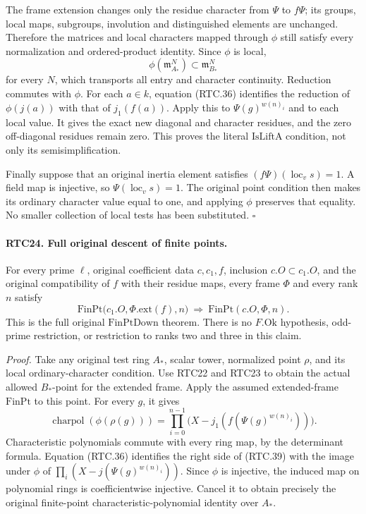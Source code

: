 \documentclass[11pt,a4paper]{article}
\numberwithin{equation}{section}
\theoremstyle{remark}\newtheorem{remark}[theorem]{Remark}
\begin{document}
The frame extension changes only the residue character from
\(\Psi\) to \(f\Psi\); its groups, local maps, subgroups,
involution and distinguished elements are unchanged.  Therefore
the matrices and local characters mapped through \(\phi\)
still satisfy every normalization and ordered-product identity.
Since \(\phi\) is local,
\[
 \phi(\mathfrak m_{A_*}^N)\subset\mathfrak m_{B_*}^N
                                                        \tag{RTC.37}
\]
for every \(N\), which transports all entry and character
continuity.  Reduction commutes with \(\phi\).  For each
\(a\in k\), equation (RTC.36) identifies the reduction of
\(\phi(j(a))\) with that of \(j_1(f(a))\).
Apply this to \(\Psi(g)^{w(n)_i}\) and to each local value.
It gives the exact new diagonal and character residues, and
the zero off-diagonal residues remain zero.  This proves the
literal \(\mathrm{IsLiftA}\) condition, not only its
semisimplification.

Finally suppose that an original inertia element satisfies
\((f\Psi)(\operatorname{loc}_v s)=1\).  A field map is
injective, so \(\Psi(\operatorname{loc}_v s)=1\).
The original point condition then makes its ordinary character
value equal to one, and applying \(\phi\) preserves that
equality.  No smaller collection of local tests has been substituted.
\hfill\(\square\)

\paragraph{RTC24. Full original descent of finite points.}
\label{claim:RTC24}
For every prime \(\ell\), original coefficient data
\(c,c_1,f\), inclusion \(c.O\subset c_1.O\), and the
original compatibility of \(f\) with their residue maps,
every frame \(\Phi\) and every rank \(n\) satisfy
\[
 \mathrm{FinPt}\bigl(c_1.O,\Phi.\mathrm{ext}(f),n\bigr)
       \ \Longrightarrow\
 \mathrm{FinPt}(c.O,\Phi,n).
                                                        \tag{RTC.38}
\]
This is the full original \(\mathrm{FinPtDown}\) theorem.
There is no \(F.\mathrm{Ok}\) hypothesis, odd-prime
restriction, or restriction to ranks two and three in this claim.

\emph{Proof.}
Take any original test ring \(A_*\), scalar tower, normalized
point \(\rho\), and its local ordinary-character condition.
Use RTC22 and RTC23 to obtain the actual allowed \(B_*\)-point
for the extended frame.  Apply the assumed extended-frame
\(\mathrm{FinPt}\) to this point.  For every \(g\), it gives
\[
 \operatorname{charpol}(\phi(\rho(g)))
     =\prod_{i=0}^{n-1}
         \bigl(X-j_1(f(\Psi(g)^{w(n)_i}))\bigr).
                                                        \tag{RTC.39}
\]
Characteristic polynomials commute with every ring map, by the
determinant formula.  Equation (RTC.36) identifies the right side
of (RTC.39) with the image under \(\phi\) of
\(\prod_i(X-j(\Psi(g)^{w(n)_i}))\).  Since \(\phi\) is
injective, the induced map on polynomial rings is coefficientwise
injective.  Cancel it to obtain precisely the original finite-point
characteristic-polynomial identity over \(A_*\).
\end{document}
